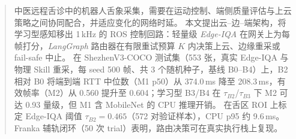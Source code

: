 \begin{abstract}
中医远程舌诊中的机器人舌象采集，需要在运动控制、端侧质量评估与上云策略之间协同配合，并适应变化的网络时延。
本文提出云--边--端架构，将学习型感知移出 1\,kHz 的 ROS 控制回路：轻量级 \emph{Edge-IQA} 在网关上为每帧打分，\emph{LangGraph} 路由器在有限重试预算 $K$ 内决策上云、边缘重采或 fail-safe 中止。
在 ShezhenV3-COCO 测试集（553 张，真实 Edge-IQA 与物理 Skill 重采，每 seed 500 帧、共 3 个随机种子，基线 B0--B4）上，B2 相对 B0 将端到端 RTT 中位数（M1 p50）从 374.0\,ms 降至 208.3\,ms，有效帧率（M2）从 0.560 提升至 0.604；学习型 B3/B4 在 $\tau_{B2}$/$\tau_{B3}$ 下 M2 可达 0.93 量级，但 M1 含 MobileNet 的 CPU 推理开销。
在舌区 ROI 上标定 Edge-IQA 阈值 $\tau_{B2}{=}0.465$（572 对验证样本），CPU p95 约 9.6\,ms。
Franka 辅轨闭环（50 次 trial）表明，路由决策可在真实执行栈上复现。
\end{abstract}
